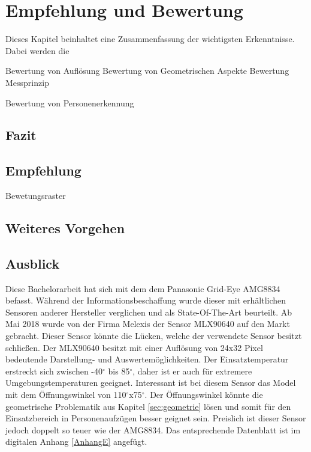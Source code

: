 \chapter{Empfehlung und Bewertung}
\label{Empfehlung_Vorgehen}

Dieses Kapitel beinhaltet eine Zusammenfassung der wichtigsten Erkenntnisse. Dabei werden die 


Bewertung von Auflösung
Bewertung von Geometrischen Aspekte
Bewertung Messprinzip

Bewertung von Personenerkennung

\section{Fazit}
\label{Fazit}


\section{Empfehlung}


Bewetungsraster


\section{Weiteres Vorgehen}


\section{Ausblick}

Diese Bachelorarbeit hat sich mit dem dem Panasonic Grid-Eye AMG8834 befasst. Während der Informationsbeschaffung wurde dieser mit erhältlichen Sensoren anderer Hersteller verglichen und als State-Of-The-Art beurteilt.  
Ab Mai 2018 wurde von der Firma Melexis der Sensor MLX90640 auf den Markt gebracht. Dieser Sensor könnte die Lücken, welche der verwendete Sensor besitzt schließen. Der MLX90640 besitzt mit einer Auflösung von 24x32 Pixel bedeutende Darstellung- und Auswertemöglichkeiten. Der Einsatztemperatur erstreckt sich zwischen -40$^\circ$ bis 85$^\circ$, daher ist er auch für extremere Umgebungstemperaturen geeignet. Interessant ist bei diesem Sensor das Model mit dem Öffnungswinkel von 110$^\circ$x75$^\circ$. Der Öffnungswinkel könnte die geometrische Problematik aus Kapitel \ref{sec:geometrie} lösen und somit für den Einsatzbereich in Personenaufzügen besser geignet sein. Preislich ist dieser Sensor jedoch doppelt so teuer wie der AMG8834. Das entsprechende Datenblatt ist im digitalen Anhang \ref{AnhangE} angefügt. 



